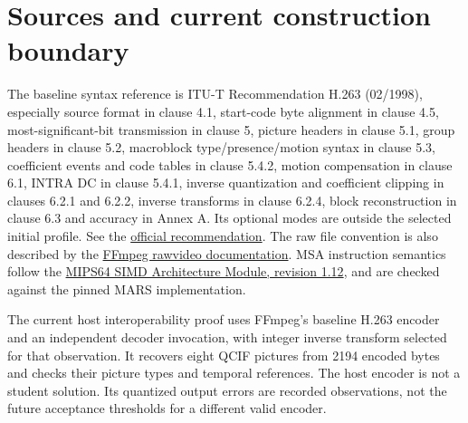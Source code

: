 \section{Sources and current construction boundary}
The baseline syntax reference is ITU-T Recommendation H.263 (02/1998), especially
source format in clause 4.1, start-code byte alignment in clause 4.5,
most-significant-bit transmission in clause 5, picture headers in clause 5.1, group headers in clause 5.2,
macroblock type/presence/motion syntax in clause 5.3, coefficient events and code
tables in clause 5.4.2, motion
compensation in clause 6.1, INTRA DC in clause 5.4.1, inverse quantization and
coefficient clipping in clauses 6.2.1 and 6.2.2, inverse transforms in clause
6.2.4, block reconstruction in clause 6.3 and accuracy in
Annex A. Its optional modes
are outside the selected initial profile. See the
\href{https://www.itu.int/rec/dologin_pub.asp?id=T-REC-H.263-199802-S!!PDF-E&lang=e&type=items}{official recommendation}.
The raw file convention is also described by the
\href{https://ffmpeg.org/ffmpeg-formats.html#rawvideo}{FFmpeg rawvideo documentation}.
MSA instruction semantics follow the
\href{https://s3-eu-west-1.amazonaws.com/downloads-mips/documents/MD00868-1D-MSA64-AFP-01.12.pdf}{MIPS64 SIMD Architecture Module, revision 1.12},
and are checked against the pinned MARS implementation.

The current host interoperability proof uses FFmpeg's baseline H.263 encoder and
an independent decoder invocation, with integer inverse transform selected for
that observation. It recovers eight QCIF pictures from 2194 encoded bytes and
checks their picture types and temporal references. The host encoder is not a
student solution. Its quantized output errors are recorded observations, not the
future acceptance thresholds for a different valid encoder.

